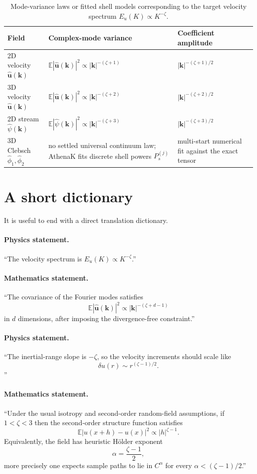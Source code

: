 \documentclass[11pt]{article}
\newcommand{\E}{\mathbb{E}}
\newcommand{\kk}{\mathbf{k}}
\newcommand{\uu}{\mathbf{u}}
\begin{document}
\begin{table}[h]
\centering
\caption{Mode-variance laws or fitted shell models corresponding to the target velocity spectrum $E_u(K)\propto K^{-\zeta}$.}
\label{tab:summary}
\begin{tabular}{@{}lll@{}}
\toprule
Field & Complex-mode variance & Coefficient amplitude \\
\midrule
2D velocity $\hat{\uu}(\kk)$
& $\E |\hat{\uu}(\kk)|^2 \propto |\kk|^{-(\zeta+1)}$
& $|\kk|^{-(\zeta+1)/2}$ \\
3D velocity $\hat{\uu}(\kk)$
& $\E |\hat{\uu}(\kk)|^2 \propto |\kk|^{-(\zeta+2)}$
& $|\kk|^{-(\zeta+2)/2}$ \\
2D stream $\hat{\psi}(\kk)$
& $\E |\hat{\psi}(\kk)|^2 \propto |\kk|^{-(\zeta+3)}$
& $|\kk|^{-(\zeta+3)/2}$ \\
3D Clebsch $\hat{\phi}_1,\hat{\phi}_2$
& no settled universal continuum law;
  AthenaK fits discrete shell powers $P_s^{(j)}$
& multi-start numerical fit against the exact tensor \\
\bottomrule
\end{tabular}
\end{table}

\section{A short dictionary}
It is useful to end with a direct translation dictionary.

\paragraph{Physics statement.}
``The velocity spectrum is $E_u(K)\propto K^{-\zeta}$.''

\paragraph{Mathematics statement.}
``The covariance of the Fourier modes satisfies
\[
\E |\hat{\uu}(\kk)|^2 \propto |\kk|^{-(\zeta+d-1)}
\]
in $d$ dimensions, after imposing the divergence-free constraint.''

\paragraph{Physics statement.}
``The inertial-range slope is $-\zeta$, so the velocity increments should scale like
\[
\delta u(r)\sim r^{(\zeta-1)/2}.
\]
''

\paragraph{Mathematics statement.}
``Under the usual isotropy and second-order random-field assumptions, if $1<\zeta<3$ then the second-order structure function satisfies
\[
\E |u(x+h)-u(x)|^2 \propto |h|^{\zeta-1}.
\]
Equivalently, the field has heuristic H\"older exponent
\[
\alpha = \frac{\zeta-1}{2},
\]
more precisely one expects sample paths to lie in $C^{\alpha}$ for every $\alpha<(\zeta-1)/2$.''
\end{document}
